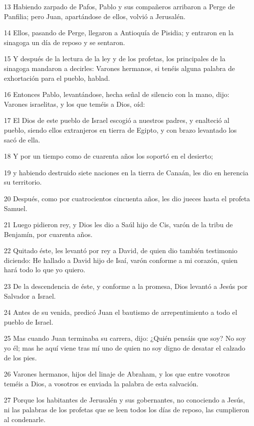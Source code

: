 \par 13 Habiendo zarpado de Pafos, Pablo y sus compañeros arribaron a Perge de Panfilia; pero Juan, apartándose de ellos, volvió a Jerusalén.
\par 14 Ellos, pasando de Perge, llegaron a Antioquía de Pisidia; y entraron en la sinagoga un día de reposo y se sentaron.
\par 15 Y después de la lectura de la ley y de los profetas, los principales de la sinagoga mandaron a decirles: Varones hermanos, si tenéis alguna palabra de exhortación para el pueblo, hablad.
\par 16 Entonces Pablo, levantándose, hecha señal de silencio con la mano, dijo: Varones israelitas, y los que teméis a Dios, oíd:
\par 17 El Dios de este pueblo de Israel escogió a nuestros padres, y enalteció al pueblo, siendo ellos extranjeros en tierra de Egipto, y con brazo levantado los sacó de ella.
\par 18 Y por un tiempo como de cuarenta años los soportó en el desierto;
\par 19 y habiendo destruido siete naciones en la tierra de Canaán, les dio en herencia su territorio.
\par 20 Después, como por cuatrocientos cincuenta años, les dio jueces hasta el profeta Samuel.
\par 21 Luego pidieron rey, y Dios les dio a Saúl hijo de Cis, varón de la tribu de Benjamín, por cuarenta años.
\par 22 Quitado éste, les levantó por rey a David, de quien dio también testimonio diciendo: He hallado a David hijo de Isaí, varón conforme a mi corazón, quien hará todo lo que yo quiero.
\par 23 De la descendencia de éste, y conforme a la promesa, Dios levantó a Jesús por Salvador a Israel.
\par 24 Antes de su venida, predicó Juan el bautismo de arrepentimiento a todo el pueblo de Israel.
\par 25 Mas cuando Juan terminaba su carrera, dijo: ¿Quién pensáis que soy? No soy yo él; mas he aquí viene tras mí uno de quien no soy digno de desatar el calzado de los pies.
\par 26 Varones hermanos, hijos del linaje de Abraham, y los que entre vosotros teméis a Dios, a vosotros es enviada la palabra de esta salvación.
\par 27 Porque los habitantes de Jerusalén y sus gobernantes, no conociendo a Jesús, ni las palabras de los profetas que se leen todos los días de reposo, las cumplieron al condenarle.
